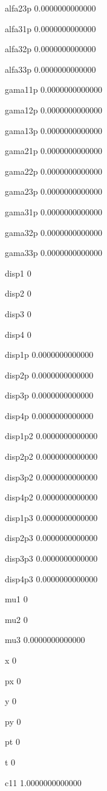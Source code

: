  alfa23p
   0.0000000000000 
  
 alfa31p
   0.0000000000000 
  
 alfa32p
   0.0000000000000 
  
 alfa33p
   0.0000000000000 
  
 gama11p
   0.0000000000000 
  
 gama12p
   0.0000000000000 
  
 gama13p
   0.0000000000000 
  
 gama21p
   0.0000000000000 
  
 gama22p
   0.0000000000000 
  
 gama23p
   0.0000000000000 
  
 gama31p
   0.0000000000000 
  
 gama32p
   0.0000000000000 
  
 gama33p
   0.0000000000000 
  
 disp1  
 0 
  
 disp2  
 0 
  
 disp3  
 0 
  
 disp4  
 0 
  
 disp1p 
   0.0000000000000 
  
 disp2p 
   0.0000000000000 
  
 disp3p 
   0.0000000000000 
  
 disp4p 
   0.0000000000000 
  
 disp1p2
   0.0000000000000 
  
 disp2p2
   0.0000000000000 
  
 disp3p2
   0.0000000000000 
  
 disp4p2
   0.0000000000000 
  
 disp1p3
   0.0000000000000 
  
 disp2p3
   0.0000000000000 
  
 disp3p3
   0.0000000000000 
  
 disp4p3
   0.0000000000000 
  
 mu1    
 0 
  
 mu2    
 0 
  
 mu3    
   0.0000000000000 
  
 x      
 0 
  
 px     
 0 
  
 y      
 0 
  
 py     
 0 
  
 pt     
 0 
  
 t      
 0 
  
 c11
   1.0000000000000 
  
